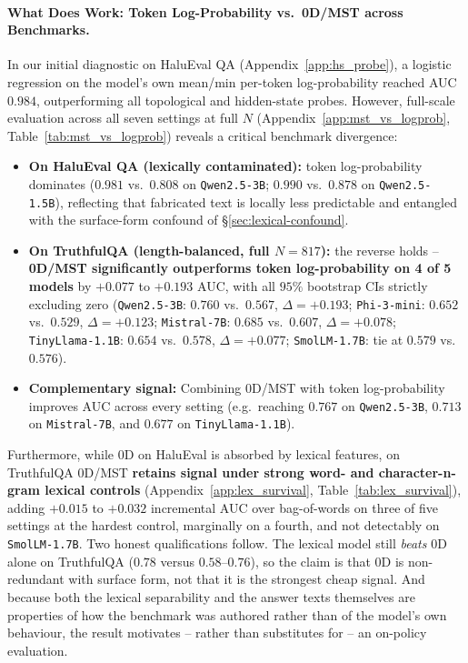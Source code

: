 \documentclass{article}
\begin{document}
\paragraph{What Does Work: Token Log-Probability vs.\ 0D/MST across Benchmarks.} In our initial diagnostic on HaluEval QA (Appendix~\ref{app:hs_probe}), a logistic regression on the model's own mean/min per-token log-probability reached AUC $\mathbf{0.984}$, outperforming all topological and hidden-state probes. However, full-scale evaluation across all seven settings at full $N$ (Appendix~\ref{app:mst_vs_logprob}, Table~\ref{tab:mst_vs_logprob}) reveals a critical benchmark divergence:
\begin{itemize}
    \item \textbf{On HaluEval QA (lexically contaminated):} token log-probability dominates ($0.981$ vs.\ $0.808$ on \texttt{Qwen2.5-3B}; $0.990$ vs.\ $0.878$ on \texttt{Qwen2.5-1.5B}), reflecting that fabricated text is locally less predictable and entangled with the surface-form confound of \S\ref{sec:lexical-confound}.
    \item \textbf{On TruthfulQA (length-balanced, full $N{=}817$):} the reverse holds -- \textbf{0D/MST significantly outperforms token log-probability on 4 of 5 models} by $+0.077$ to $+0.193$ AUC, with all $95\%$ bootstrap CIs strictly excluding zero (\texttt{Qwen2.5-3B}: $0.760$ vs.\ $0.567$, $\Delta=+0.193$; \texttt{Phi-3-mini}: $0.652$ vs.\ $0.529$, $\Delta=+0.123$; \texttt{Mistral-7B}: $0.685$ vs.\ $0.607$, $\Delta=+0.078$; \texttt{TinyLlama-1.1B}: $0.654$ vs.\ $0.578$, $\Delta=+0.077$; \texttt{SmolLM-1.7B}: tie at $0.579$ vs.\ $0.576$).
    \item \textbf{Complementary signal:} Combining 0D/MST with token log-probability improves AUC across every setting (e.g.\ reaching $0.767$ on \texttt{Qwen2.5-3B}, $0.713$ on \texttt{Mistral-7B}, and $0.677$ on \texttt{TinyLlama-1.1B}).
\end{itemize}
Furthermore, while $0$D on HaluEval is absorbed by lexical features, on TruthfulQA $0$D/MST \textbf{retains signal under strong word- and character-n-gram lexical controls} (Appendix~\ref{app:lex_survival}, Table~\ref{tab:lex_survival}), adding $+0.015$ to $+0.032$ incremental AUC over bag-of-words on three of five settings at the hardest control, marginally on a fourth, and not detectably on \texttt{SmolLM-1.7B}. Two honest qualifications follow. The lexical model still \emph{beats} $0$D alone on TruthfulQA ($0.78$ versus $0.58$--$0.76$), so the claim is that $0$D is non-redundant with surface form, not that it is the strongest cheap signal. And because both the lexical separability and the answer texts themselves are properties of how the benchmark was authored rather than of the model's own behaviour, the result motivates -- rather than substitutes for -- an on-policy evaluation.
\end{document}
